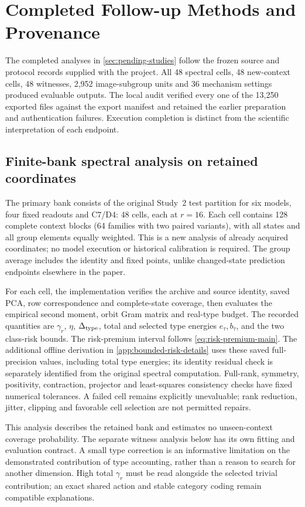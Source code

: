 \section{Completed Follow-up Methods and Provenance}
\label{app:pending-protocols}
The completed analyses in \cref{sec:pending-studies} follow the frozen source and protocol records supplied with the project. All 48 spectral cells, 48 new-context cells, 48 witnesses, 2,952 image-subgroup units and 36 mechanism settings produced evaluable outputs. The local audit verified every one of the 13,250 exported files against the export manifest and retained the earlier preparation and authentication failures. Execution completion is distinct from the scientific interpretation of each endpoint.

\subsection{Finite-bank spectral analysis on retained coordinates}
The primary bank consists of the original Study~2 test partition for six models, four fixed readouts and C7/D4: 48 cells, each at $r=16$. Each cell contains 128 complete context blocks (64 families with two paired variants), with all states and all group elements equally weighted. This is a new analysis of already acquired coordinates; no model execution or historical calibration is required. The group average includes the identity and fixed points, unlike changed-state prediction endpoints elsewhere in the paper.

For each cell, the implementation verifies the archive and source identity, saved PCA, row correspondence and complete-state coverage, then evaluates the empirical second moment, orbit Gram matrix and real-type budget. The recorded quantities are $\gamma_r$, $\eta$, $\Delta_{\rm type}$, total and selected type energies $e_\tau,b_\tau$, and the two class-risk bounds. The risk-premium interval follows \cref{eq:risk-premium-main}. The additional offline derivation in \cref{app:bounded-risk-details} uses these saved full-precision values, including total type energies; its identity residual check is separately identified from the original spectral computation. Full-rank, symmetry, positivity, contraction, projector and least-squares consistency checks have fixed numerical tolerances. A failed cell remains explicitly unevaluable; rank reduction, jitter, clipping and favorable cell selection are not permitted repairs.

This analysis describes the retained bank and estimates no unseen-context coverage probability. The separate witness analysis below has its own fitting and evaluation contract. A small type correction is an informative limitation on the demonstrated contribution of type accounting, rather than a reason to search for another dimension. High total $\gamma_r$ must be read alongside the selected trivial contribution; an exact shared action and stable category coding remain compatible explanations.

